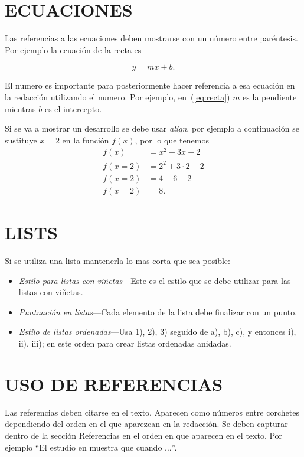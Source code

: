 \documentclass{IEEEcsmag}
\begin{document}
\section{ECUACIONES}
Las referencias a las ecuaciones deben mostrarse con un número entre paréntesis. Por ejemplo la ecuación de la recta es

\begin{equation}
y = mx + b.
\label{eq:recta}
\end{equation}

El numero es importante para posteriormente hacer referencia a esa ecuación en la redacción utilizando el numero. Por ejemplo, en~(\ref{eq:recta}) $m$ es la pendiente mientras $b$ es el intercepto.



Si se va a mostrar un desarrollo se debe usar \textit{align}, por ejemplo a continuación se sustituye $x = 2$ en la función $f(x)$, por lo que tenemos 
\begin{align*}
    f(x) &= x^{2} + 3x - 2\\
    f(x=2) &= 2^{2} + 3 \cdot 2 - 2\\
    f(x=2) &= 4 + 6 - 2\\
    f(x=2) &=8.
\end{align*}


\section{LISTS}

Si se utiliza una lista mantenerla lo mas corta que sea posible:

\begin{itemize}
\item[{\ieeeguilsinglright}] {\it Estilo para listas con viñetas}---Este es el estilo que se debe utilizar para las listas con viñetas.
	
\item[{\ieeeguilsinglright}] {\it Puntuación en listas}---Cada elemento de la lista debe finalizar con un punto.

\item[{\ieeeguilsinglright}] {\it Estilo de listas ordenadas}---Usa 1), 2), 3) seguido de  a), b), c), y entonces i), ii), iii); en este orden para crear listas ordenadas anidadas.
\end{itemize}


\section{USO DE REFERENCIAS}
Las referencias deben citarse en el texto. Aparecen como números entre corchetes dependiendo del orden en el que aparezcan en la redacción. Se deben capturar dentro de la  sección Referencias en el orden en que aparecen en el texto. Por ejemplo ``El estudio en \cite{AA1}  muestra que cuando $\ldots$''.
\end{document}
